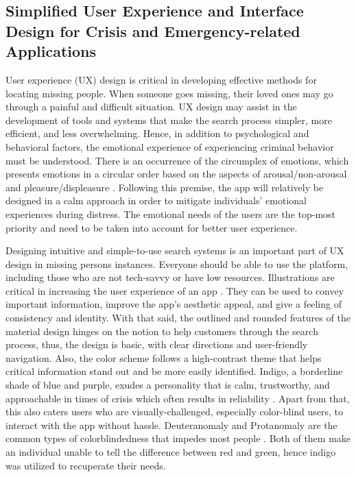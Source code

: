 \subsection{Simplified User Experience and Interface Design for Crisis and Emergency-related Applications}

User experience (UX) design is critical in developing effective methods for locating missing people. When someone goes missing, their loved ones may go through a painful and difficult situation. UX design may assist in the development of tools and systems that make the search process simpler, more efficient, and less overwhelming. Hence, in addition to psychological and behavioral factors, the emotional experience of experiencing criminal behavior must be understood. There is an occurrence of the circumplex of emotions, which presents emotions in a circular order based on the aspects of arousal/non-arousal and pleasure/displeasure \cite{hunt_2020, suchana_2021}. Following this premise, the app will relatively be designed in a calm approach in order to mitigate individuals' emotional experiences during distress. The emotional needs of the users are the top-most priority and need to be taken into account for better user experience. 
 
Designing intuitive and simple-to-use search systems is an important part of UX design in missing persons instances. Everyone should be able to use the platform, including those who are not tech-savvy or have low resources. Illustrations are critical in increasing the user experience of an app \cite{suchana_2021}. They can be used to convey important information, improve the app's aesthetic appeal, and give a feeling of consistency and identity. With that said, the outlined and rounded features of the material design hinges on the notion to help customers through the search process, thus, the design is basic, with clear directions and user-friendly navigation. Also, the color scheme follows a high-contrast theme that helps critical information stand out and be more easily identified. Indigo, a borderline shade of blue and purple, exudes a personality that is calm, trustworthy, and approachable in times of crisis which often results in reliability \cite{babich_2017}. Apart from that, this also caters users who are visually-challenged, especially color-blind users, to interact with the app without hassle. Deuteranomaly and Protanomaly are the common types of colorblindedness that impedes most people \cite{babich_2017, NEI_2019}. Both of them make an individual unable to tell the difference between red and green, hence indigo was utilized to recuperate their needs. 
 
